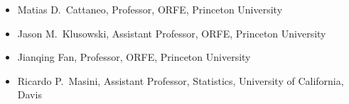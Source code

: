 \documentclass{wgu-cv}
\begin{document}
\vspace{-0.22cm}

\begin{itemize}

  \item
    Matias D.\ Cattaneo,
    Professor,
    ORFE,
    Princeton University

  \item
    Jason M.\ Klusowski,
    Assistant Professor,
    ORFE,
    Princeton University

  \item
    Jianqing Fan,
    Professor,
    ORFE,
    Princeton University

  \item
    Ricardo P.\ Masini,
    Assistant Professor,
    Statistics,
    University of California, Davis

\end{itemize}
\end{document}
